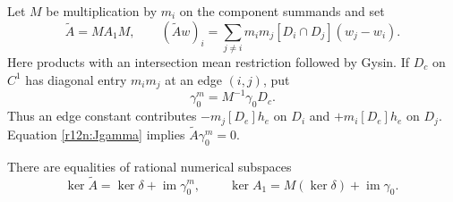 Let $M$ be multiplication by $m_i$ on the component summands and set
\[
 \widetilde A=M A_1 M,
 \qquad (\widetilde A w)_i
        =\sum_{j\ne i}m_im_j[D_i\cap D_j](w_j-w_i).
\tag{NL6}\label{r12n:weighted-A}
\]
Here products with an intersection mean restriction followed by Gysin.
If $D_c$ on $C^1$ has diagonal entry $m_im_j$ at an edge $(i,j)$, put
\[
             \gamma_0^m=M^{-1}\gamma_0D_c.
\tag{NL7}\label{r12n:weighted-gamma}
\]
Thus an edge constant contributes $-m_j[D_e]h_e$ on $D_i$ and
$+m_i[D_e]h_e$ on $D_j$.  Equation \eqref{r12n:Jgamma} implies
$\widetilde A\gamma_0^m=0$.

\begin{lemma}
\label{r12n:kernel}
There are equalities of rational numerical subspaces
\[
 \ker\widetilde A=\ker\delta+\operatorname{im}\gamma_0^m,
 \qquad
 \boxed{\ \ker A_1=M(\ker\delta)+\operatorname{im}\gamma_0.\ }
\tag{NL8}\label{r12n:kernel-formula}
\]
\end{lemma}

